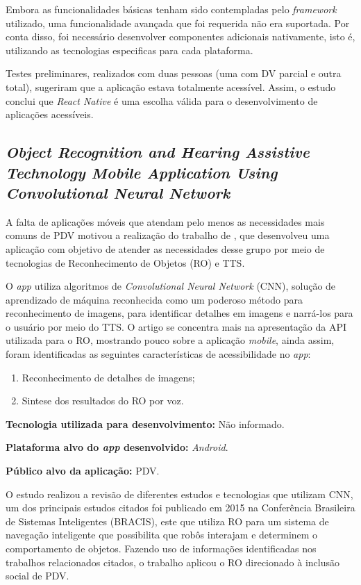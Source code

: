 Embora as funcionalidades básicas tenham sido contempladas pelo \emph{framework} utilizado, uma funcionalidade avançada que foi requerida não era suportada.
Por conta disso, foi necessário desenvolver componentes adicionais nativamente, isto é, utilizando as tecnologias especificas para cada plataforma.

Testes preliminares, realizados com duas pessoas (uma com DV parcial e outra total), sugeriram que a aplicação estava totalmente acessível.
Assim, o estudo conclui que \emph{React Native} é uma escolha válida para o desenvolvimento de aplicações acessíveis.

\subsection{\emph{Object Recognition and Hearing Assistive Technology Mobile Application Using Convolutional Neural Network}}

A falta de aplicações móveis que atendam pelo menos as necessidades mais comuns de PDV motivou a realização do trabalho de , que desenvolveu
uma aplicação com objetivo de atender as necessidades desse grupo por meio de tecnologias de Reconhecimento de Objetos (RO) e TTS\@.

O \emph{app} utiliza algoritmos de \emph{Convolutional Neural Network} (CNN), solução de aprendizado de máquina reconhecida como um poderoso método para reconhecimento de
imagens, para identificar detalhes em imagens e narrá\@-los para o usuário por meio do TTS\@. O artigo se concentra mais na apresentação da API utilizada para o RO, mostrando
pouco sobre a aplicação \emph{mobile}, ainda assim, foram identificadas as seguintes características de acessibilidade no \emph{app}:

\begin{enumerate}
    \item Reconhecimento de detalhes de imagens;
    \item Sintese dos resultados do RO por voz.
\end{enumerate}

\textbf{Tecnologia utilizada para desenvolvimento:} Não informado.

\textbf{Plataforma alvo do \emph{app} desenvolvido:} \emph{Android}.

\textbf{Público alvo da aplicação:} PDV\@.

O estudo realizou a revisão de diferentes estudos e tecnologias que utilizam CNN, um dos principais estudos citados
foi publicado em 2015 na Conferência Brasileira de Sistemas Inteligentes (BRACIS), este que utiliza RO para um sistema
de navegação inteligente que possibilita que robôs interajam e determinem o comportamento de objetos.
Fazendo uso de informações identificadas nos trabalhos relacionados citados, o trabalho aplicou o RO direcionado à inclusão social de PDV\@.

